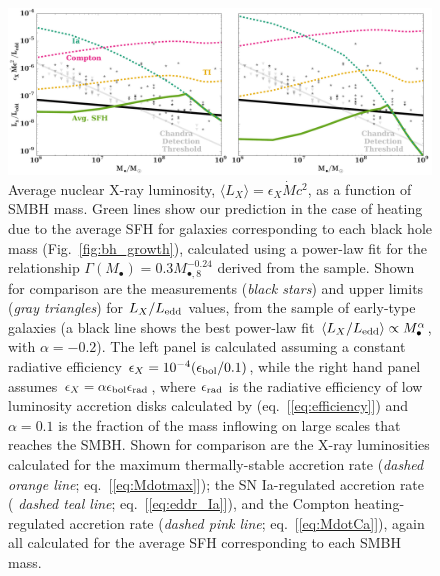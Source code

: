 \documentclass[usenatbib,fleqn]{mn2e}
\newcommand{\Mdot}{\dot{M}}
\newcommand{\Mbheight}{M_{\bullet,8}}
\begin{document}
\begin{figure}
\includegraphics[width=\textwidth]{miller.pdf}
\caption{\label{fig:miller} Average nuclear X-ray luminosity, $\langle
  L_X \rangle = \epsilon_X \Mdot c^2$, as a function of SMBH mass.
  Green lines show our prediction in the case of heating due to the
  average SFH for galaxies corresponding to each black hole mass
  (Fig.~\ref{fig:bh_growth}), calculated using a power-law fit for the
  relationship $\Gamma(M_{\bullet})=0.3 \Mbheight^{-0.24}$ derived
  from the \citet{LauerFaber+:2007a} sample.  Shown for comparison are
  the measurements ({\it black stars}) and upper limits ({\it gray
    triangles}) for $L_X/L_{\rm edd}$ values, from the
  \citet{Miller+15} sample of early-type galaxies (a black line shows
  the best power-law fit $\langle L_X/L_{\rm edd}\rangle \propto
  M_{\bullet}^{\alpha}$, with $\alpha = -0.2$).  The left panel is
  calculated assuming a constant radiative efficiency
  $\epsilon_X=10^{-4} (\epsilon_{\rm bol}/0.1)$, while the right hand
  panel assumes $\epsilon_X= \alpha \epsilon_{\rm bol}\epsilon_{\rm
    rad}$, where $\epsilon_{\rm rad}$ is the radiative efficiency of
  low luminosity accretion disks calculated by \citet{Sharma+2007}
  (eq.~[\ref{eq:efficiency}]) and $\alpha = 0.1$ is the fraction of
  the mass inflowing on large scales that reaches the SMBH.  Shown for
  comparison are the X-ray luminosities calculated for the maximum
  thermally-stable accretion rate ({\it dashed orange line};
  eq.~[\ref{eq:Mdotmax}]); the SN Ia-regulated accretion rate ({\it
    dashed teal line}; eq.~[\ref{eq:eddr_Ia}]), and the Compton
  heating-regulated accretion rate ({\it dashed pink line};
  eq.~[\ref{eq:MdotCa}]), again all calculated for the average SFH
  corresponding to each SMBH mass.}
\end{figure}
\end{document}

